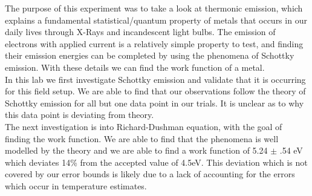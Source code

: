 The purpose of this experiment was to take a look at thermonic emission, which explains a fundamental statistical/quantum property of metals that occurs in our daily lives through X-Rays and incandescent light bulbs. The emission of electrons with applied current is a relatively simple property to test, and finding their emission energies can be completed by using the phenomena of Schottky emission. With these details we can find the work function of a metal.\\

In this lab we first investigate Schottky emission and validate that it is occurring for this field setup. We are able to find that our observations follow the theory of Schottky emission for all but one data point in our trials. It is unclear as to why this data point is deviating from theory.\\

The next investigation is into Richard-Dushman equation, with the goal of finding the work function. We are able to find that the phenomena is well modelled by the theory and we are able to find a work function of 5.24 $\pm$ .54 eV which deviates 14\% from the accepted value of 4.5eV. This deviation which is not covered by our error bounds is likely due to a lack of accounting for the errors which occur in temperature estimates.\\